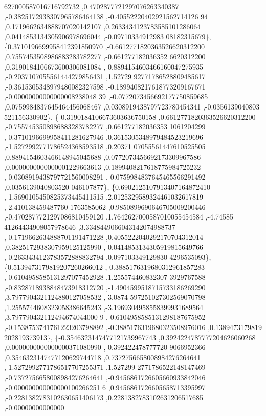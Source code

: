 \begin{DoxyCode}
      627000587016716792732 ,0.4702877721297076263340387 ,-0.3825172938307965786464138 ,-0.40552220402921562714126
      94 ,0.1719662634888707020142107 ,0.2633434123783585101286064 ,0.0414853134305906978696044 ,-0.09710334912983
      08182315679\},
\{0.3710196699958412391850970 ,-0.6612771820363526620312200 ,0.7557453508986883283782277 ,-0.661277182036352
      6620312200 ,0.3190184106673600306081084 ,-0.8894154603466160047275935 ,-0.2037107055561444279856431 ,1.52729
      92771786528809485617 ,-0.3615305348979480082327598 ,-0.1899408217618773209167671 ,-0.00000000000000008238048
      39 ,-0.0772073456692177750859685 ,0.0759984837645464456068467 ,0.0308919438797723780454341 ,-0.0356139040803
      521156330902\},
\{-0.3190184106673603636750158 ,0.6612771820363526620312200 ,-0.7557453508986883283782277 ,0.661277182036353
      1061204299 ,-0.3710196699958411281627946 ,0.3615305348979484523219696 ,-1.5272992771786524368593518 ,0.20371
      07055561447610525505 ,0.8894154603466148945045688 ,0.0772073456692173309967586 ,0.0000000000000001229663613 
      ,0.1899408217618775984725232 ,-0.0308919438797721560008291 ,-0.0759984837645465566291492 ,0.0356139040803520
      046107877\},
\{0.6902125107913407164872410 ,-1.5690105450825373445411515 ,2.0125329589324461032617819 ,-2.410138459487760
      1763585062 ,0.9850899690646705009200446 ,-0.4702877721297086810459120 ,1.7642627000587010055454584 ,-4.74585
      41264434908057978646 ,3.3348449066043142074988737 ,-0.1719662634888701191471228 ,0.4055222040292170704312014
       ,0.3825172938307959125125990 ,-0.0414853134305919815649766 ,-0.2633434123783572888832794 ,0.097103349129830
      4296535093\},
\{0.5139473179819207260266012 ,-0.3885176319680312961857283 ,-0.6104958585131297077452928 ,1.255574460832307
      3929767588 ,-0.8328718938848473918312720 ,-1.4904599518715733186269290 ,3.7977904321124880127058532 ,-3.0874
      597251027302569070798 ,1.2555744608323058386645243 ,-3.1969304958558399931689564 ,3.797790432112494674044000
      9 ,-0.6104958585131298187675952 ,-0.1538753741761223203798892 ,-0.3885176319680323508976016 ,0.1389473179819
      202819373913\},
\{-0.3546323147477121739967743 ,0.3924224787777204626060268 ,0.0000000000000000371080990 ,-0.392422478777720
      9066952366 ,0.3546323147477120629744718 ,0.7372756658008984276264641 ,-1.5272992771786517707255371 ,1.527299
      2771786522148147469 ,-0.7372756658008984276264641 ,-0.9456861726605660933842046 ,-0.000000000000000100266251
      6 ,0.9456861726605658713395997 ,-0.2281382783102630651406173 ,0.2281382783102631206517685 ,-0.00000000000000

\end{DoxyCode}
